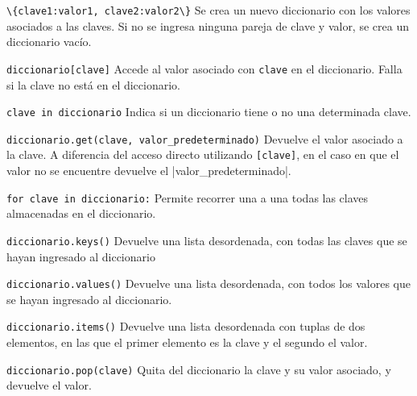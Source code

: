 \begin{referencia_python}

\begin{sintaxis}{\lstinline!\{clave1:valor1, clave2:valor2\}!}
Se crea un nuevo diccionario con los valores asociados a las claves.  Si no
se ingresa ninguna pareja de clave y valor, se crea un diccionario vacío.
\end{sintaxis}

\begin{sintaxis}{\lstinline{diccionario[clave]}}
Accede al valor asociado con \lstinline!clave! en el diccionario. Falla si la
clave no está en el diccionario.
\end{sintaxis}

\begin{sintaxis}{\lstinline{clave in diccionario}}
Indica si un diccionario tiene o no una determinada clave.
\end{sintaxis}

\begin{sintaxis}{\lstinline{diccionario.get(clave, valor_predeterminado)}}
Devuelve el valor asociado a la clave.  A diferencia del acceso directo
utilizando \lstinline{[clave]}, en el caso en que el valor no se
encuentre devuelve el |valor_predeterminado|.
\end{sintaxis}

\begin{sintaxis}{\lstinline{for clave in diccionario:}}
Permite recorrer una a una todas las claves almacenadas en
el diccionario.
\end{sintaxis}

\begin{sintaxis}{\lstinline{diccionario.keys()}}
Devuelve una lista desordenada, con todas las claves que se hayan ingresado
al diccionario
\end{sintaxis}

\begin{sintaxis}{\lstinline{diccionario.values()}}
Devuelve una lista desordenada, con todos los valores que se hayan
ingresado al diccionario.
\end{sintaxis}

\begin{sintaxis}{\lstinline{diccionario.items()}}
Devuelve una lista desordenada con tuplas de dos elementos, en las que el
primer elemento es la clave y el segundo el valor.
\end{sintaxis}

\begin{sintaxis}{\lstinline{diccionario.pop(clave)}}
Quita del diccionario la clave y su valor asociado, y devuelve el valor.
\end{sintaxis}
\end{referencia_python}


